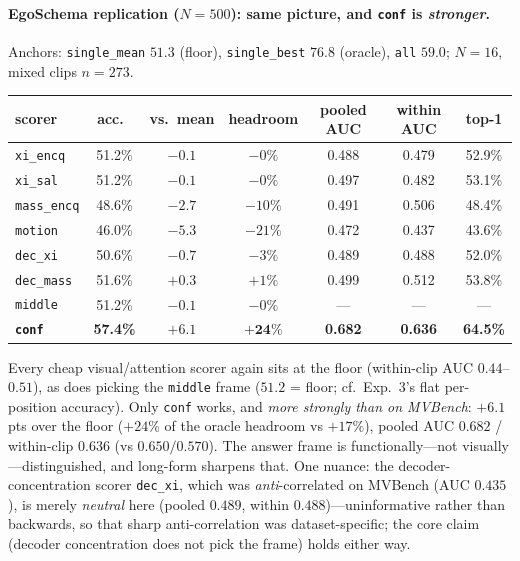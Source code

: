 \documentclass[11pt]{article}
\begin{document}
\paragraph{EgoSchema replication ($N{=}500$): same picture, and \texttt{conf} is
\emph{stronger}.} Anchors: \texttt{single\_mean} $51.3$ (floor), \texttt{single\_best}
$76.8$ (oracle), \texttt{all} $59.0$; $N{=}16$, mixed clips $n{=}273$.

\begin{center}
\begin{tabular}{lccc@{\hskip 2em}ccc}
\toprule
scorer & acc.\ & vs.\ mean & headroom & pooled AUC & within AUC & top-1 \\
\midrule
\texttt{xi\_encq}   & 51.2\% & $-0.1$ & $-0\%$  & 0.488 & 0.479 & 52.9\% \\
\texttt{xi\_sal}    & 51.2\% & $-0.1$ & $-0\%$  & 0.497 & 0.482 & 53.1\% \\
\texttt{mass\_encq} & 48.6\% & $-2.7$ & $-10\%$ & 0.491 & 0.506 & 48.4\% \\
\texttt{motion}     & 46.0\% & $-5.3$ & $-21\%$ & 0.472 & 0.437 & 43.6\% \\
\texttt{dec\_xi}    & 50.6\% & $-0.7$ & $-3\%$  & 0.489 & 0.488 & 52.0\% \\
\texttt{dec\_mass}  & 51.6\% & $+0.3$ & $+1\%$  & 0.499 & 0.512 & 53.8\% \\
\texttt{middle}     & 51.2\% & $-0.1$ & $-0\%$  & --- & --- & --- \\
\textbf{\texttt{conf}} & \textbf{57.4\%} & $\mathbf{+6.1}$ & $\mathbf{+24\%}$ & \textbf{0.682} & \textbf{0.636} & \textbf{64.5\%} \\
\bottomrule
\end{tabular}
\end{center}

Every cheap visual/attention scorer again sits at the floor (within-clip AUC $0.44$--$0.51$),
as does picking the \texttt{middle} frame ($51.2$ = floor; cf.\ Exp.~3's flat per-position
accuracy). Only \texttt{conf} works, and \emph{more strongly than on MVBench}: $+6.1$ pts
over the floor ($+24\%$ of the oracle headroom vs $+17\%$), pooled AUC $0.682$ / within-clip
$0.636$ (vs $0.650/0.570$). The answer frame is functionally---not visually---distinguished,
and long-form sharpens that. One nuance: the decoder-concentration scorer \texttt{dec\_xi},
which was \emph{anti}-correlated on MVBench (AUC $0.435$), is merely \emph{neutral} here
(pooled $0.489$, within $0.488$)---uninformative rather than backwards, so that sharp
anti-correlation was dataset-specific; the core claim (decoder concentration does not pick
the frame) holds either way.
\end{document}
